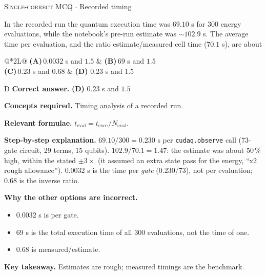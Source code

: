 \documentclass[11pt,a4paper]{article}
\newcommand{\optlabel}[1]{\textbf{(#1)}}
\newcommand{\correctlabel}[1]{\textcolor{okgreen}{\textbf{(#1)}\,\ding{51}}}
\newenvironment{qitem}[1]{\begin{list}{}{\setlength{\leftmargin}{3.3em}\setlength{\labelwidth}{3.1em}%
  \setlength{\labelsep}{0.2em}\setlength{\topsep}{3pt}\setlength{\parsep}{3pt}}\item[\textbf{Q.#1}\hfill]}{\end{list}}
\newcommand{\qsep}{\par\vspace{2pt}{\color{black!15}\hrule}\vspace{4pt}}
\newcommand{\qmeta}[2]{{\footnotesize\color{black!60}\textsc{#1} \;$\cdot$\; #2}\par}
\begin{document}
\begin{qitem}{76}
\qmeta{Single-correct MCQ}{Recorded timing}
In the recorded run the quantum execution time was $69.10$ s for $300$ energy evaluations, while the notebook's pre-run estimate was $\sim102.9$ s.
The average time per evaluation, and the ratio estimate/measured cell time ($70.1$ s), are about
\par\smallskip\noindent\begin{tabularx}{\linewidth}{@{}*{2}{L}@{}}
\optlabel{A}\,$0.0032$ s and $1.5$ & \optlabel{B}\,$69$ s and $1.5$ \\[3pt]
\optlabel{C}\,$0.23$ s and $0.68$ & \correctlabel{D}\,$0.23$ s and $1.5$
\end{tabularx}
\end{qitem}
\begin{solbox}{D}
\textbf{\color{brand}Correct answer.} \textcolor{okgreen}{\textbf{(D)}} $0.23$ s and $1.5$

\textbf{\color{brand}Concepts required.} Timing analysis of a recorded run.

\textbf{\color{brand}Relevant formulae.} $t_{\mathrm{eval}} = t_{\mathrm{exec}}/N_{\mathrm{eval}}$.

\textbf{\color{brand}Step-by-step explanation.} $69.10/300 = 0.230$ s per \texttt{cudaq.observe} call (73-gate circuit, 29 terms, 15 qubits). $102.9/70.1 = 1.47$: the estimate was about $50\,\%$ high,
within the stated $\pm3\times$ (it assumed an extra state pass for the energy, ``x2 rough allowance''). $0.0032$ s is the time per \emph{gate}
($0.230/73$), not per evaluation; $0.68$ is the inverse ratio.

\textbf{\color{brand}Why the other options are incorrect.}
\begin{itemize}[leftmargin=2.4em, itemsep=1pt, topsep=2pt]
\item[\textbf{(A)}] $0.0032$ s is per gate.
\item[\textbf{(B)}] $69$ s is the total execution time of all 300 evaluations, not the time of one.
\item[\textbf{(C)}] $0.68$ is measured/estimate.
\end{itemize}
\textbf{\color{brand}Key takeaway.} Estimates are rough; measured timings are the benchmark.
\end{solbox}
\qsep
\end{document}
